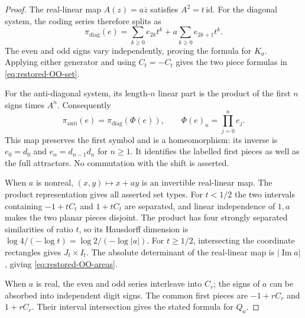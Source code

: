 \begin{proof}
The real-linear map $A(z)=a\overline z$ satisfies $A^2=t\,\mathrm{id}$.
For the diagonal system, the coding series therefore splits as
\begin{equation}\label{eq:restored-OO-coding}
 \pi_{\mathrm{diag}}(e)
 =\sum_{k\ge0}e_{2k}t^k+a\sum_{k\ge0}e_{2k+1}t^k.
\end{equation}
The even and odd signs vary independently, proving the formula for
$K_a$. Applying either generator and using $C_t=-C_t$ gives the two
piece formulas in \eqref{eq:restored-OO-set}.

For the anti-diagonal system, its length-$n$ linear part is the
product of the first $n$ signs times $A^n$. Consequently
\[
 \pi_{\mathrm{anti}}(e)=\pi_{\mathrm{diag}}(\Phi(e)),\qquad
 \Phi(e)_n=\prod_{j=0}^n e_j.
\]
This map preserves the first symbol and is a homeomorphism: its
inverse is $e_0=d_0$ and $e_n=d_{n-1}d_n$ for $n\ge1$.
It identifies the labelled first pieces as well as the full
attractors. No commutation with the shift is asserted.

When $a$ is nonreal, $(x,y)\mapsto x+ay$ is an invertible real-linear
map. The product representation gives all asserted set types.
For $t<1/2$ the two intervals containing $-1+tC_t$ and $1+tC_t$
are separated, and linear independence of $1,a$ makes the two
planar pieces disjoint. The product has four strongly separated
similarities of ratio $t$, so its Hausdorff dimension is
$\log4/(-\log t)=\log2/(-\log|a|)$.
For $t\ge1/2$, intersecting the coordinate rectangles gives
$J_t\times I_t$. The absolute determinant of the real-linear map
is $|\operatorname{Im}a|$, giving \eqref{eq:restored-OO-areas}.

When $a$ is real, the even and odd series interleave into $C_r$;
the signs of $a$ can be absorbed into independent digit signs.
The common first pieces are $-1+rC_r$ and $1+rC_r$.
Their interval intersection gives the stated formula for $Q_a$.
\end{proof}

